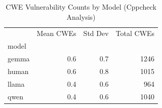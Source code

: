 \begin{table}[htbp]
\caption{CWE Vulnerability Counts by Model (Cppcheck Analysis)}
\label{tab:cwe_summary}
\begin{tabular}{lrrr}
\toprule
 & Mean CWEs & Std Dev & Total CWEs \\
model &  &  &  \\
\midrule
gemma & 0.6 & 0.7 & 1246 \\
human & 0.6 & 0.8 & 1015 \\
llama & 0.4 & 0.6 & 964 \\
qwen & 0.4 & 0.6 & 1040 \\
\bottomrule
\end{tabular}
\end{table}
